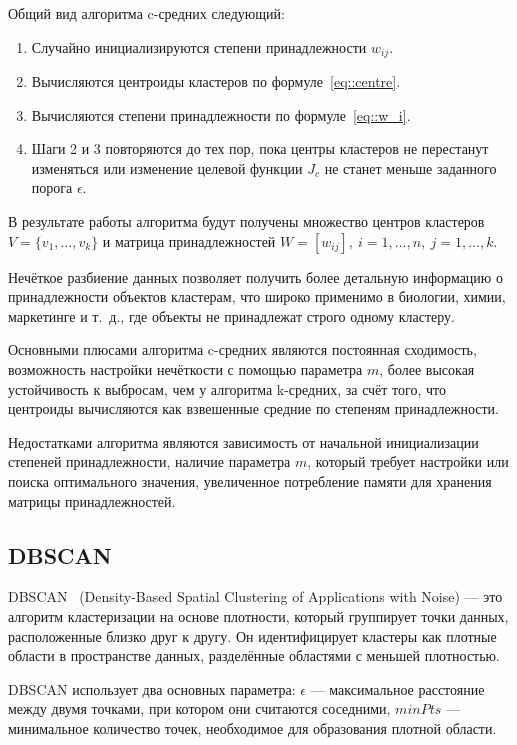 Общий вид алгоритма c-средних следующий:
\begin{enumerate}
	\item Случайно инициализируются степени принадлежности $w_{ij}$.
	\item Вычисляются центроиды кластеров по формуле~\ref{eq::centre}.
	\item Вычисляются степени принадлежности по формуле~\ref{eq::w_i}.
	\item Шаги 2 и 3 повторяются до тех пор, пока центры кластеров не перестанут изменяться или изменение целевой функции $J_c$ не станет меньше заданного порога $\epsilon$.
\end{enumerate}

В результате работы алгоритма будут получены множество центров кластеров $V = \{ v_1, \dots, v_k\}$ и матрица принадлежностей $W = [w_{ij}],\ i = 1, \dots, n,\ j = 1, \dots, k$.

Нечёткое разбиение данных позволяет получить более детальную информацию о принадлежности объектов кластерам, что широко применимо в биологии, химии, маркетинге и т.~д., где объекты не принадлежат строго одному кластеру.

Основными плюсами алгоритма c-средних являются постоянная сходимость, возможность настройки нечёткости с помощью параметра $m$, более высокая устойчивость к выбросам, чем у алгоритма k-средних, за счёт того, что центроиды вычисляются как взвешенные средние по степеням принадлежности.

Недостатками алгоритма являются зависимость от начальной инициализации степеней принадлежности, наличие параметра $m$, который требует настройки или поиска оптимального значения, увеличенное потребление памяти для хранения матрицы принадлежностей.


\subsection{DBSCAN}
DBSCAN~\cite{DBSCAN} (Density-Based Spatial Clustering of Applications with Noise) --- это алгоритм кластеризации на основе плотности, который группирует точки данных, расположенные близко друг к другу. Он идентифицирует кластеры как плотные области в пространстве данных, разделённые областями с меньшей плотностью.

DBSCAN использует два основных параметра: $\epsilon$ --- максимальное расстояние между двумя точками, при котором они считаются соседними, $minPts$ --- минимальное количество точек, необходимое для образования плотной области.


